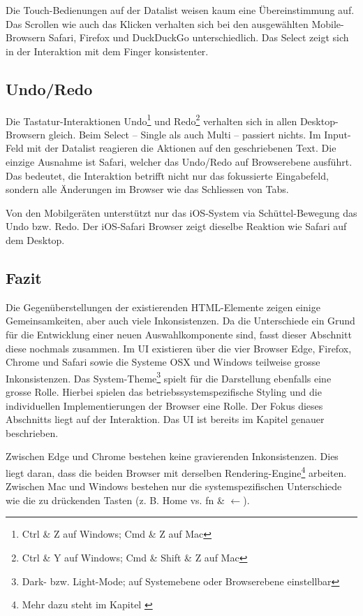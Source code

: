 Die Touch-Bedienungen auf der Datalist weisen kaum eine Übereinstimmung auf. 
Das Scrollen wie auch das Klicken verhalten sich bei den ausgewählten Mobile-Browsern Safari, Firefox und DuckDuckGo unterschiedlich. 
Das Select zeigt sich in der Interaktion mit dem Finger konsistenter. 


\subsection{Undo/Redo}
\label{sec:undoRedo}

Die Tastatur-Interaktionen Undo\footnote{
    Ctrl \& Z auf Windows; Cmd \& Z auf Mac
} und Redo\footnote{
    Ctrl \& Y auf Windows; Cmd \& Shift \& Z auf Mac
} verhalten sich in allen Desktop-Browsern gleich. 
Beim Select – Single als auch Multi – passiert nichts. 
Im Input-Feld mit der Datalist reagieren die Aktionen auf den geschriebenen Text. 
Die einzige Ausnahme ist Safari, welcher das Undo/Redo auf Browserebene ausführt. 
Das bedeutet, die Interaktion betrifft nicht nur das fokussierte Eingabefeld, sondern alle Änderungen im Browser wie das Schliessen von Tabs. 

Von den Mobilgeräten unterstützt nur das iOS-System via Schüttel-Bewegung das Undo bzw. Redo. 
Der iOS-Safari Browser zeigt dieselbe Reaktion wie Safari auf dem Desktop. 


\clearpage
\subsection{Fazit}
\label{sec:summeryExisting}

Die Gegenüberstellungen der existierenden HTML-Elemente zeigen einige Gemeinsamkeiten, aber auch viele Inkonsistenzen. 
Da die Unterschiede ein Grund für die Entwicklung einer neuen Auswahlkomponente sind, fasst dieser Abschnitt diese nochmals zusammen. 
Im UI existieren über die vier Browser Edge, Firefox, Chrome und Safari sowie die Systeme OSX und Windows teilweise grosse Inkonsistenzen. 
Das System-Theme\footnote{
    Dark- bzw. Light-Mode; auf Systemebene oder Browserebene einstellbar
} spielt für die Darstellung ebenfalls eine grosse Rolle. 
Hierbei spielen das betriebssystemspezifische Styling und die individuellen Implementierungen der Browser eine Rolle. 
Der Fokus dieses Abschnitts liegt auf der Interaktion. 
Das UI ist bereits im Kapitel \textbf{} genauer beschrieben. 

Zwischen Edge und Chrome bestehen keine gravierenden Inkonsistenzen. 
Dies liegt daran, dass die beiden Browser mit derselben Rendering-Engine\footnote{
    Mehr dazu steht im Kapitel \textbf{}
} arbeiten. 
Zwischen Mac und Windows bestehen nur die systemspezifischen Unterschiede wie die zu drückenden Tasten (z. B. Home vs. fn \& $\leftarrow$). 

